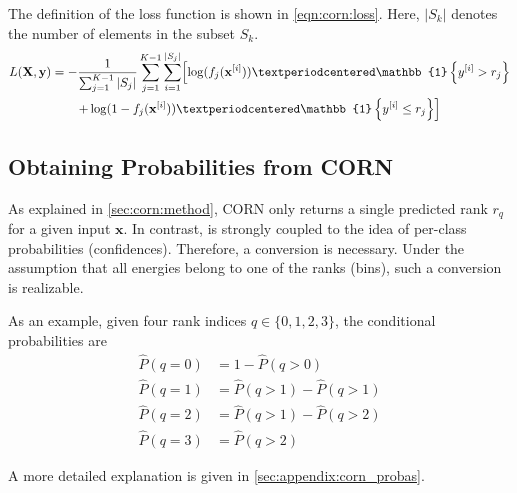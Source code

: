 The definition of the loss function is shown in \autoref{eqn:corn:loss}.
Here, $|S_k|$ denotes the number of elements in the subset $S_k$.
\begin{multline}
  \label{eqn:corn:loss}
  L(\mathbf{X}, \mathbf{y}) =
  - \frac{1}{\sum_{j=1}^{K-1} |S_j|}
  \sum_{j=1}^{K-1}
  \sum_{i=1}^{|S_j|}
  \Bigl[
    \log(f_j(\mathbf{x}^{[i]})) · \mathbb{1}\left\{y^{[i]} > r_j\right\}
    \\
    +
    \log(1 - f_j(\mathbf{x}^{[i]})) · \mathbb{1}\left\{y^{[i]} \leq r_j\right\}
  \Bigr]
\end{multline}


\subsection{Obtaining Probabilities from CORN} \label{sec:ordinal:corn:probas}
As explained in \autoref{sec:corn:method},
\Ac{CORN} only returns a single predicted rank $r_q$ for a given input $\mathbf{x}$.
In contrast,
\dsea{} is strongly coupled to the idea of per-class probabilities (confidences).
Therefore, a conversion is necessary.
Under the assumption that all energies belong to one of the ranks (bins),
such a conversion is realizable.

As an example, given four rank indices $q \in \{0, 1, 2, 3\}$,
the conditional probabilities are
\newcommand{\myP}{\hat{P}}
\begin{align*}
  \myP(q=0) &= 1 - \myP(q>0) \\
  \myP(q=1) &= \myP(q>1) - \myP(q>1) \\
  \myP(q=2) &= \myP(q>1) - \myP(q>2) \\
  \myP(q=3) &= \myP(q>2)
\end{align*}

A more detailed explanation is given in \autoref{sec:appendix:corn_probas}.


